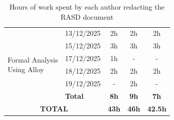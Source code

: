 \begin{table}[H]
\begin{tabular}{|l|l|c|c|c|}
\multirow{6}{*}{\parbox{3cm}{Formal Analysis\\Using Alloy}}
& 13/12/2025 & 2h & 2h & 2h \\
& 15/12/2025 & 3h & 3h & 3h \\
& 17/12/2025 & 1h & - & - \\
& 18/12/2025 & 2h & 2h & 2h \\
& 19/12/2025 & - & 2h & - \\
\cline{2-5}
& \textbf{Total} & \textbf{8h} & \textbf{9h} & \textbf{7h} \\ 
\hline

\multicolumn{2}{|c|}{\textbf{TOTAL}} & \textbf{43h} & \textbf{46h} & \textbf{42.5h} \\
\hline

\end{tabular}
\caption{Hours of work spent by each author redacting the RASD document}
\label{tab:effort}
\end{table}
